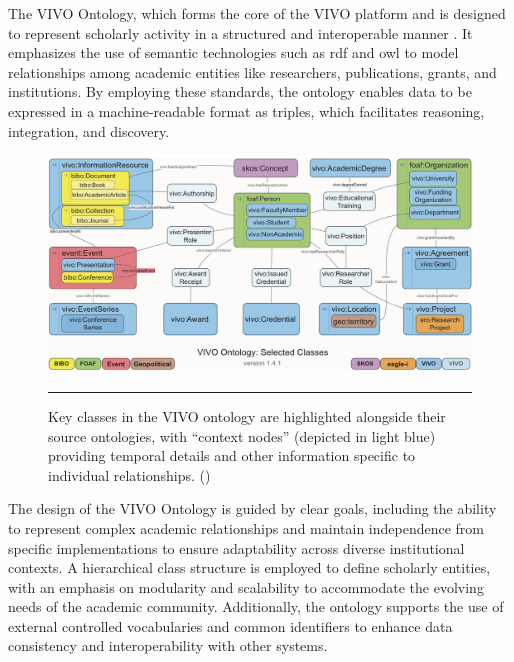 The VIVO Ontology, which forms the core of the VIVO platform and is designed to represent scholarly activity in a structured and interoperable manner \cite{VIVO}.
It emphasizes the use of semantic technologies such as \gls{rdf} and \gls{owl} to model relationships among academic entities like researchers, publications, grants, and institutions.
By employing these standards, the ontology enables data to be expressed in a machine-readable format as triples, which facilitates reasoning, integration, and discovery.

\begin{figure}[htbp]
    \centering
 \includegraphics[width=.9\textwidth]{figures/literature-review/vivo-ontology.png}
     \rule{35em}{0.5pt}
    \caption{Key classes in the VIVO ontology are highlighted alongside their source ontologies, with ``context nodes'' (depicted in light blue) providing temporal details and other information specific to individual relationships. (\textcite{VIVO})}
 \label{fig:vivo-ontology}
\end{figure}

The design of the VIVO Ontology is guided by clear goals, including the ability to represent complex academic relationships and maintain independence from specific implementations to ensure adaptability across diverse institutional contexts.
A hierarchical class structure is employed to define scholarly entities, with an emphasis on modularity and scalability to accommodate the evolving needs of the academic community.
Additionally, the ontology supports the use of external controlled vocabularies and common identifiers to enhance data consistency and interoperability with other systems.

